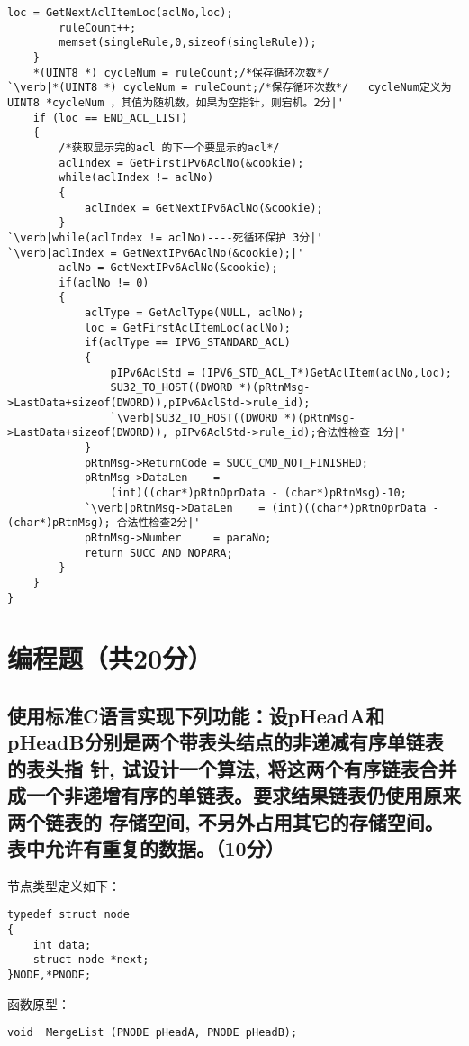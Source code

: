﻿\documentclass  [11pt,onecolumn,a4paper]{article}
\begin{document}
\begin{lstlisting}[escapeinside=`']
        loc = GetNextAclItemLoc(aclNo,loc);
        ruleCount++;
        memset(singleRule,0,sizeof(singleRule));
    }
    *(UINT8 *) cycleNum = ruleCount;/*保存循环次数*/ 
`\verb|*(UINT8 *) cycleNum = ruleCount;/*保存循环次数*/   cycleNum定义为 UINT8 *cycleNum ，其值为随机数，如果为空指针，则宕机。2分|'
    if (loc == END_ACL_LIST)
    {
        /*获取显示完的acl 的下一个要显示的acl*/
        aclIndex = GetFirstIPv6AclNo(&cookie);
        while(aclIndex != aclNo)
        {
            aclIndex = GetNextIPv6AclNo(&cookie);
        }
`\verb|while(aclIndex != aclNo)----死循环保护 3分|'
`\verb|aclIndex = GetNextIPv6AclNo(&cookie);|'
		aclNo = GetNextIPv6AclNo(&cookie);
		if(aclNo != 0)
        {
            aclType = GetAclType(NULL, aclNo);
            loc = GetFirstAclItemLoc(aclNo);
            if(aclType == IPV6_STANDARD_ACL)
            {
                pIPv6AclStd = (IPV6_STD_ACL_T*)GetAclItem(aclNo,loc);
                SU32_TO_HOST((DWORD *)(pRtnMsg->LastData+sizeof(DWORD)),pIPv6AclStd->rule_id);
                `\verb|SU32_TO_HOST((DWORD *)(pRtnMsg->LastData+sizeof(DWORD)), pIPv6AclStd->rule_id);合法性检查 1分|'
            }
            pRtnMsg->ReturnCode	= SUCC_CMD_NOT_FINISHED;
            pRtnMsg->DataLen	=
                (int)((char*)pRtnOprData - (char*)pRtnMsg)-10;
            `\verb|pRtnMsg->DataLen    = (int)((char*)pRtnOprData - (char*)pRtnMsg); 合法性检查2分|'
            pRtnMsg->Number	    = paraNo;
            return SUCC_AND_NOPARA;
        }
    }
}
\end{lstlisting}

\pagebreak

\begin{minipage}{0.9\textwidth}
\section{编程题（共20分）}
\subsection{使用标准C语言实现下列功能：设pHeadA和pHeadB分别是两个带表头结点的非递减有序单链表的表头指
  针, 试设计一个算法, 将这两个有序链表合并成一个非递增有序的单链表。要求结果链表仍使用原来两个链表的
  存储空间, 不另外占用其它的存储空间。表中允许有重复的数据。（10分）}
节点类型定义如下：
\begin{lstlisting}
typedef struct node
{
    int data;
    struct node *next;
}NODE,*PNODE;
\end{lstlisting}
函数原型：
\begin{lstlisting}
void  MergeList (PNODE pHeadA, PNODE pHeadB);
\end{lstlisting}
\end{minipage}
\end{document}
